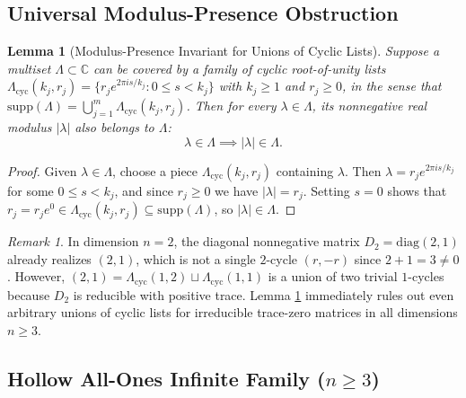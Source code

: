 \documentclass[11pt]{article}
\newtheorem{lemma}[theorem]{Lemma}
\theoremstyle{definition}
\theoremstyle{remark}
\newtheorem{remark}[theorem]{Remark}
\begin{document}
\subsection{Universal Modulus-Presence Obstruction}

\begin{lemma}[Modulus-Presence Invariant for Unions of Cyclic Lists]\label{lem:modulus}
Suppose a multiset $\Lambda \subset \mathbb{C}$ can be covered by a family of cyclic
root-of-unity lists $\Lambda_{\mathrm{cyc}}(k_j, r_j) = \{r_j e^{2\pi i s / k_j} : 0 \le s
< k_j\}$ with $k_j \ge 1$ and $r_j \ge 0$, in the sense that
$\mathrm{supp}(\Lambda) = \bigcup_{j=1}^m \Lambda_{\mathrm{cyc}}(k_j, r_j)$. Then for
every $\lambda \in \Lambda$, its nonnegative real modulus $|\lambda|$ also belongs to
$\Lambda$:
\[
  \lambda \in \Lambda \implies |\lambda| \in \Lambda.
\]
\end{lemma}

\begin{proof}
Given $\lambda \in \Lambda$, choose a piece $\Lambda_{\mathrm{cyc}}(k_j, r_j)$ containing
$\lambda$. Then $\lambda = r_j e^{2\pi i s / k_j}$ for some $0 \le s < k_j$, and since
$r_j \ge 0$ we have $|\lambda| = r_j$. Setting $s = 0$ shows that $r_j = r_j e^0 \in
\Lambda_{\mathrm{cyc}}(k_j, r_j) \subseteq \mathrm{supp}(\Lambda)$, so $|\lambda| \in
\Lambda$.
\end{proof}

\begin{remark}
In dimension $n = 2$, the diagonal nonnegative matrix $D_2 = \mathrm{diag}(2, 1)$ already
realizes $(2, 1)$, which is not a single $2$-cycle $(r, -r)$ since $2 + 1 = 3 \ne 0$.
However, $(2, 1) = \Lambda_{\mathrm{cyc}}(1, 2) \sqcup \Lambda_{\mathrm{cyc}}(1, 1)$ is a
union of two trivial $1$-cycles because $D_2$ is reducible with positive trace. Lemma
\ref{lem:modulus} immediately rules out even arbitrary unions of cyclic lists for
irreducible trace-zero matrices in all dimensions $n \ge 3$.
\end{remark}

\subsection{Hollow All-Ones Infinite Family (\texorpdfstring{$n \ge 3$}{n >= 3})}
\end{document}
